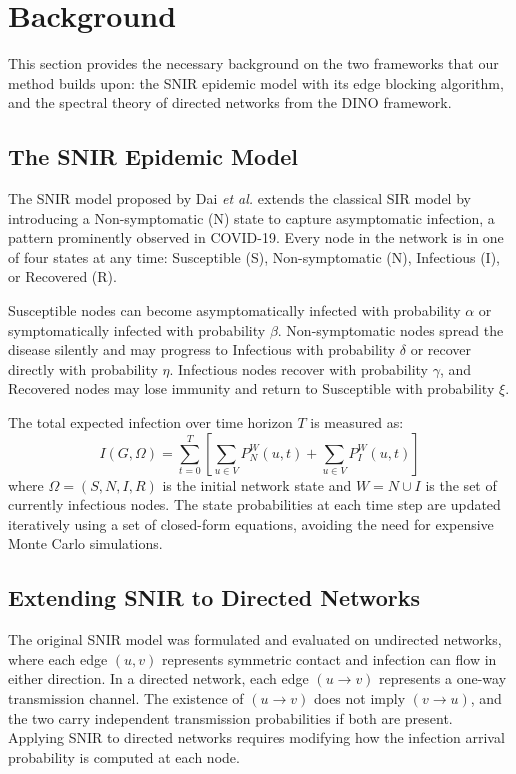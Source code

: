 \documentclass[conference]{IEEEtran}
\begin{document}
\section{Background}

This section provides the necessary background on the two frameworks that our method builds upon: the SNIR epidemic model with its edge blocking algorithm, and the spectral theory of directed networks from the DINO framework.

\subsection{The SNIR Epidemic Model}

The SNIR model proposed by Dai \textit{et al.} extends the classical SIR model by introducing a Non-symptomatic (N) state to capture asymptomatic infection, a pattern prominently observed in COVID-19. Every node in the network is in one of four states at any time: Susceptible (S), Non-symptomatic (N), Infectious (I), or Recovered (R).

Susceptible nodes can become asymptomatically infected with probability $\alpha$ or symptomatically infected with probability $\beta$. Non-symptomatic nodes spread the disease silently and may progress to Infectious with probability $\delta$ or recover directly with probability $\eta$. Infectious nodes recover with probability $\gamma$, and Recovered nodes may lose immunity and return to Susceptible with probability $\xi$.

The total expected infection over time horizon $T$ is measured as:
\begin{equation}
I(G, \Omega) = \sum_{t=0}^{T} \left[ \sum_{u \in V} P_N^W(u,t) + \sum_{u \in V} P_I^W(u,t) \right]
\end{equation}
where $\Omega = (S, N, I, R)$ is the initial network state and $W = N \cup I$ is the set of currently infectious nodes. The state probabilities at each time step are updated iteratively using a set of closed-form equations, avoiding the need for expensive Monte Carlo simulations.

\subsection{Extending SNIR to Directed Networks}

The original SNIR model was formulated and evaluated on undirected networks, where each edge $(u,v)$ represents symmetric contact and infection can flow in either direction. In a directed network, each edge $(u \to v)$ represents a one-way transmission channel. The existence of $(u \to v)$ does not imply $(v \to u)$, and the two carry independent transmission probabilities if both are present. Applying SNIR to directed networks requires modifying how the infection arrival probability is computed at each node.
\end{document}
